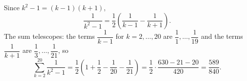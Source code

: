 Since $k^2-1=(k-1)(k+1)$,
\[\dfrac1{k^2-1}=\dfrac12\left(\dfrac1{k-1}-\dfrac1{k+1}\right).\]
The sum telescopes: the terms $\dfrac1{k-1}$ for $k=2,\dots,20$ are $\dfrac11,\dots,\dfrac1{19}$ and the terms $\dfrac1{k+1}$ are $\dfrac13,\dots,\dfrac1{21}$, so
\[\sum_{k=2}^{20}\dfrac1{k^2-1}=\dfrac12\left(1+\dfrac12-\dfrac1{20}-\dfrac1{21}\right)=\dfrac12\cdot\dfrac{630-21-20}{420}=\boxed{\dfrac{589}{840}}.\]
